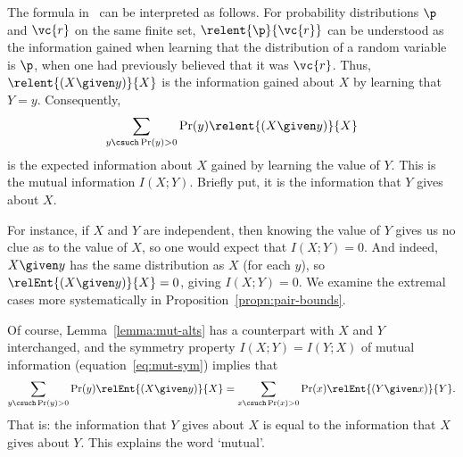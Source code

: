 The formula in~ can be interpreted as
follows.  For probability distributions $\p$ and $\vc{r}$ on the same
finite set, $\relent{\p}{\vc{r}}$ can be understood as the information
gained when learning that the distribution of a random variable is $\p$,
when one had previously believed that it was $\vc{r}$.  Thus, $\relent{(X
  \given y)}{X}$ is the information gained about $X$ by learning that $Y =
y$.  Consequently,
\[
\sum_{y \csuch \Pr(y) > 0} \Pr(y) \relent{(X \given y)}{X}
\]
is the expected information about $X$ gained by learning the value of $Y$.
This is the mutual information $I(X; Y)$.  Briefly put, it is the
information that $Y$ gives about $X$.

For instance, if $X$ and $Y$ are independent, then knowing the value of $Y$
gives us no clue as to the value of $X$, so one would expect that $I(X; Y)
= 0$.  And indeed, $X \given y$ has the same distribution as $X$ (for each
$y$), so $\relEnt{(X \given y)}{X} = 0$, giving $I(X; Y) = 0$.  We examine
the extremal cases more systematically in
Proposition~\ref{propn:pair-bounds}. 
  
Of course, Lemma~\ref{lemma:mut-alts} has a
counterpart with $X$ and $Y$ interchanged, and the symmetry property $I(X;
Y) = I(Y; X)$ of mutual information (equation~\eqref{eq:mut-sym}) implies
that
\[
\sum_{y \csuch \Pr(y) > 0} \Pr(y) \relEnt{(X \given y)}{X}
=
\sum_{x \csuch \Pr(x) > 0} \Pr(x) \relEnt{(Y \given x)}{Y}.
\]
That is: the information that $Y$ gives about $X$ is equal to the
information that $X$ gives about $Y$.  This explains the word `mutual'.

